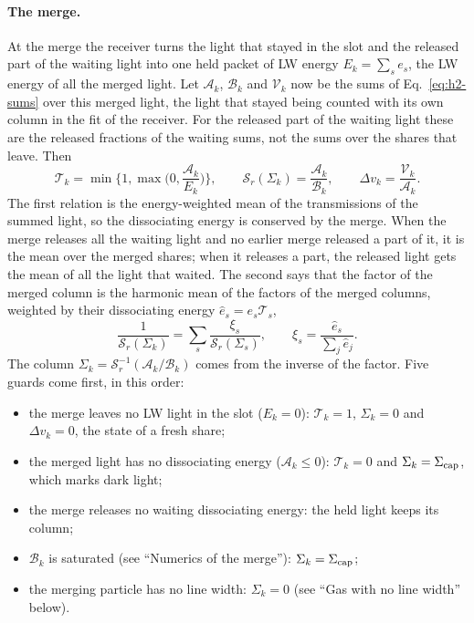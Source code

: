 \paragraph{The merge.} At the merge the receiver turns the light that stayed in
the slot and the released part of the waiting light into one held packet of LW
energy $E_k=\sum_se_s$, the LW energy of all the merged light. Let
$\mathcal A_k$, $\mathcal B_k$ and $\mathcal V_k$ now be the sums of
Eq.~\eqref{eq:h2-sums} over this merged light, the light that stayed being
counted with its own column in the fit of the receiver. For the released part
of the waiting light these are the released fractions of the waiting sums,
not the sums over the shares that leave. Then
\begin{equation}
  \mathcal T_k=\min\!\Big\{1,\max\!\Big(0,\frac{\mathcal A_k}{E_k}\Big)\Big\}, \qquad
  \mathcal S_r(\Sigma_k)=\frac{\mathcal A_k}{\mathcal B_k}, \qquad
  \Delta v_k=\frac{\mathcal V_k}{\mathcal A_k}.
  \label{eq:h2-merge}
\end{equation}
The first relation is the energy-weighted mean of the transmissions of the
summed light, so the dissociating energy is conserved by the merge. When the
merge releases all the waiting light and no earlier merge released a part of it, it is the mean over the merged shares;
when it releases a part, the released light gets the mean of all the light
that waited. The second says that the
factor of the merged column is the harmonic mean of the factors of the merged
columns, weighted by their dissociating energy $\hat e_s=e_s\mathcal T_s$,
\begin{equation}
  \frac{1}{\mathcal S_r(\Sigma_k)} = \sum_s \frac{\xi_s}{\mathcal S_r(\Sigma_s)},
  \qquad \xi_s=\frac{\hat e_s}{\sum_j \hat e_j}.
  \label{eq:h2-harmonic}
\end{equation}
The column $\Sigma_k=\mathcal S_r^{-1}(\mathcal A_k/\mathcal B_k)$ comes from the
inverse of the factor. Five guards come first, in this order:
\begin{itemize}
  \item the merge leaves no LW light in the slot ($E_k=0$): $\mathcal T_k=1$,
    $\Sigma_k=0$ and $\Delta v_k=0$, the state of a fresh share;
  \item the merged light has no dissociating energy ($\mathcal A_k\le0$):
    $\mathcal T_k=0$ and $\Sigma_k=\Sigma_{\rm cap}$, which marks dark light;
  \item the merge releases no waiting dissociating energy: the held light keeps
    its column;
  \item $\mathcal B_k$ is saturated (see ``Numerics of the merge''):
    $\Sigma_k=\Sigma_{\rm cap}$;
  \item the merging particle has no line width: $\Sigma_k=0$ (see ``Gas with
    no line width'' below).
\end{itemize}
